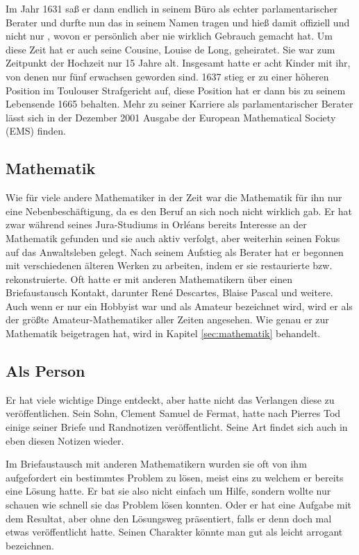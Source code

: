         Im Jahr 1631 saß er dann endlich in seinem Büro als echter parlamentarischer Berater und durfte nun das \textit{} in seinem Namen tragen und hieß damit offiziell  und nicht nur , wovon er persönlich aber nie wirklich Gebrauch gemacht hat. Um diese Zeit hat er auch seine Cousine, Louise de Long, geheiratet. Sie war zum Zeitpunkt der Hochzeit nur 15 Jahre alt. Insgesamt hatte er acht Kinder mit ihr, von denen nur fünf erwachsen geworden sind. 1637 stieg er zu einer höheren Position im Toulouser Strafgericht auf, diese Position hat er dann bis zu seinem Lebensende 1665 behalten. Mehr zu seiner Karriere als parlamentarischer Berater lässt sich in der Dezember 2001 Ausgabe der European Mathematical Society (EMS) finden. \cite{barnerNewspaper}
    
    \subsection{Mathematik} \label{sec:biografieMathematik}
        Wie für viele andere Mathematiker in der Zeit war die Mathematik für ihn nur eine Nebenbeschäftigung, da es den Beruf  an sich noch nicht wirklich gab. Er hat zwar während seines Jura-Studiums in Orléans bereits Interesse an der Mathematik gefunden und sie auch aktiv verfolgt, aber weiterhin seinen Fokus auf das Anwaltsleben gelegt. Nach seinem Aufstieg als Berater hat er begonnen mit verschiedenen älteren Werken zu arbeiten, indem er sie restaurierte bzw. rekonstruierte. Oft hatte er mit anderen Mathematikern über einen Briefaustausch Kontakt, darunter René Descartes, Blaise Pascal und weitere.  Auch wenn er nur ein Hobbyist war und als Amateur bezeichnet wird, wird er als der größte Amateur-Mathematiker aller Zeiten angesehen. \cite{mlodinow2011wenn, britannicaFermat} Wie genau er zur Mathematik beigetragen hat, wird in Kapitel \ref{sec:mathematik} behandelt.
    
    \subsection{Als Person}\label{sec:person}
        Er hat viele wichtige Dinge entdeckt, aber hatte nicht das Verlangen diese zu veröffentlichen. Sein Sohn, Clement Samuel de Fermat, hatte nach Pierres Tod einige seiner Briefe und Randnotizen veröffentlicht. Seine Art findet sich auch in eben diesen Notizen wieder. 
        
        Im Briefaustausch mit anderen Mathematikern wurden sie oft von ihm aufgefordert ein bestimmtes Problem zu lösen, meist eins zu welchem er bereits eine Lösung hatte. Er bat sie also nicht einfach um Hilfe, sondern wollte nur schauen wie schnell sie das Problem lösen konnten. Oder er hat eine Aufgabe mit dem Resultat, aber ohne den Lösungsweg präsentiert, falls er denn doch mal etwas veröffentlicht hatte. Seinen Charakter könnte man gut als leicht arrogant bezeichnen. 
        
